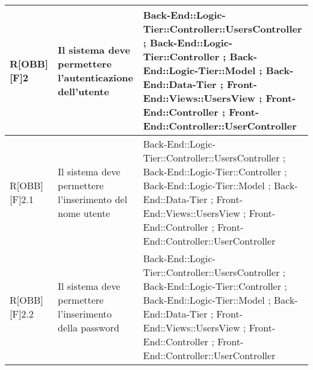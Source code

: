 \begin{table}[h]
\begin{tabular}{|p{}|p{}|p{}|}
			R[OBB][F]2 & Il sistema deve permettere l'autenticazione dell'utente & Back-End::Logic-Tier::Controller::UsersController ; Back-End::Logic-Tier::Controller ; Back-End::Logic-Tier::Model ; Back-End::Data-Tier ; Front-End::Views::UsersView ; Front-End::Controller ; Front-End::Controller::UserController \\ \midrule
			R[OBB][F]2.1 & Il sistema deve permettere l'inserimento del nome utente & Back-End::Logic-Tier::Controller::UsersController ; Back-End::Logic-Tier::Controller ; Back-End::Logic-Tier::Model ; Back-End::Data-Tier ; Front-End::Views::UsersView ; Front-End::Controller ; Front-End::Controller::UserController \\ \midrule
			R[OBB][F]2.2 & Il sistema deve permettere l'inserimento della password & Back-End::Logic-Tier::Controller::UsersController ; Back-End::Logic-Tier::Controller ; Back-End::Logic-Tier::Model ; Back-End::Data-Tier ; Front-End::Views::UsersView ; Front-End::Controller ; Front-End::Controller::UserController \\ \midrule
	
	\end{tabular}
	\end{table}
	\newpage
	
